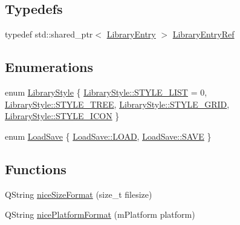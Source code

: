 \subsection*{Typedefs}
\begin{DoxyCompactItemize}
\item 
typedef std\+::shared\+\_\+ptr$<$ \mbox{\hyperlink{class_q_g_b_a_1_1_library_entry}{Library\+Entry}} $>$ \mbox{\hyperlink{namespace_q_g_b_a_a201fa9f2cb8f778666a134ba81909358}{Library\+Entry\+Ref}}
\end{DoxyCompactItemize}
\subsection*{Enumerations}
\begin{DoxyCompactItemize}
\item 
enum \mbox{\hyperlink{namespace_q_g_b_a_a4804d48d02699a2c1d2436e9269a8bb8}{Library\+Style}} \{ \mbox{\hyperlink{namespace_q_g_b_a_a4804d48d02699a2c1d2436e9269a8bb8a397c59168ddaca4c07a793957c7dc387}{Library\+Style\+::\+S\+T\+Y\+L\+E\+\_\+\+L\+I\+ST}} = 0, 
\mbox{\hyperlink{namespace_q_g_b_a_a4804d48d02699a2c1d2436e9269a8bb8a856eae15c72274b776558f9267b2035f}{Library\+Style\+::\+S\+T\+Y\+L\+E\+\_\+\+T\+R\+EE}}, 
\mbox{\hyperlink{namespace_q_g_b_a_a4804d48d02699a2c1d2436e9269a8bb8ae513c32caf07f68fd7b43733a8f6c879}{Library\+Style\+::\+S\+T\+Y\+L\+E\+\_\+\+G\+R\+ID}}, 
\mbox{\hyperlink{namespace_q_g_b_a_a4804d48d02699a2c1d2436e9269a8bb8aa0c1c60e75e4be9506992f9c01125313}{Library\+Style\+::\+S\+T\+Y\+L\+E\+\_\+\+I\+C\+ON}}
 \}
\item 
enum \mbox{\hyperlink{namespace_q_g_b_a_a7943e4735d6f412e1479e456e6f4aca2}{Load\+Save}} \{ \mbox{\hyperlink{namespace_q_g_b_a_a7943e4735d6f412e1479e456e6f4aca2a615d2885ef7576cedd9aafbb2578f028}{Load\+Save\+::\+L\+O\+AD}}, 
\mbox{\hyperlink{namespace_q_g_b_a_a7943e4735d6f412e1479e456e6f4aca2af5cf47ab06d0d98b0d16d10c82d87953}{Load\+Save\+::\+S\+A\+VE}}
 \}
\end{DoxyCompactItemize}
\subsection*{Functions}
\begin{DoxyCompactItemize}
\item 
Q\+String \mbox{\hyperlink{namespace_q_g_b_a_afe82df4edfd99518e54fedca6cb5d6c0}{nice\+Size\+Format}} (size\+\_\+t filesize)
\item 
Q\+String \mbox{\hyperlink{namespace_q_g_b_a_ab8bc21cf9ad676836dcf3259c798c90a}{nice\+Platform\+Format}} (m\+Platform platform)
\end{DoxyCompactItemize}


